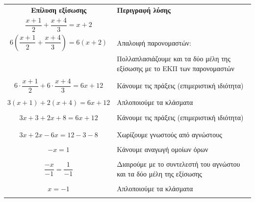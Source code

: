 \documentclass[a4paper,10pt]{report}
\begin{document}
\begin{center}
 \begin{tabular}{|c|l|}\hline 
\textbf{Επίλυση εξίσωσης} \quad        &    \textbf{Περιγραφή λύσης}       \\
$\dfrac{x+1}{2}+\dfrac{x+4}{3}=x+2$     \quad \quad                 &         \\
\hline 
 $6(\dfrac{x+1}{2}+\dfrac{x+4}{3})=6(x+2)$                                 & Απαλοιφή παρονομαστών: \\ 
                                  & Πολλαπλασιάζουμε και τα δύο μέλη της εξίσωσης με το ΕΚΠ των παρονομαστών\\   
                                  & \\                            
\hline
 $6\cdot \dfrac{x+1}{2}+6\cdot \dfrac{x+4}{3}=6x+12$   &  Κάνουμε τις πράξεις (επιμεριστική ιδιότητα)       \\
                                  & \\  
\hline
$3(x+1)+2(x+4)=6x+12$                                  &  Απλοποιούμε τα κλάσματα       \\
                                  & \\                          
\hline
$3x+3+2x+8=6x+12$                                  &  Κάνουμε τις πράξεις (επιμεριστική ιδιότητα)       \\
                                  & \\  
                                  & \\
\hline
$3x+2x-6x=12-3-8$                                  &  Χωρίζουμε γνωστούς από αγνώστους      \\
                                  & \\  
\hline
                $-x=1$                  & Κάνουμε αναγωγή ομοίων όρων       \\
                                  & \\
\hline
$\dfrac{-x}{-1}=\dfrac{1}{-1}$    &  Διαιρούμε με το συντελεστή του αγνώστου και τα δύο μέλη της εξίσωσης      \\
                                  & \\  
\hline
$x=-1$                                  &  Απλοποιούμε τα κλάσματα       \\
                                  & \\ 
\hline 
\end{tabular}
\end{center}
\end{document}
